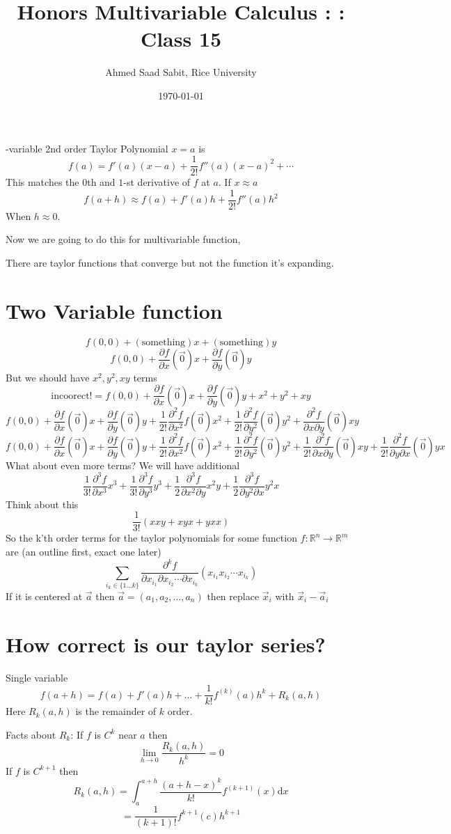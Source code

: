\documentclass[letter]{article}
\title{Honors Multivariable Calculus : : Class 15}
\author{Ahmed Saad Sabit, Rice University}
\date{\today}
\begin{document}
-variable 2nd order Taylor Polynomial $x=a$ is 
\[
f(a) = f'(a) (x-a) + \frac{1}{2!} f''(a) (x-a)^2 + \cdots
\]
This matches the 0th and $ 1$-st derivative of $f$ at $a$. If $x \approx a$ 
\[
f(a+h) \approx f(a) + f'(a) h + \frac{1}{2!} f''(a) h^2
\]
When $h \approx 0$. 

Now we are going to do this for multivariable function,

There are taylor functions that converge but not the function it's expanding. 
\section*{Two Variable function} 
\[
f(0,0) + (\text{something}) x + (\text{something})y 
\]
\[
f(0,0) + \frac{\partial f}{\partial x}(\vec{0}) x + 
\frac{\partial f}{\partial y} (\vec{0}) y 
\] 
But we should have $x^2, y^2, xy$ terms
\[ \text{incoorect!} = 
f(0,0) + \frac{\partial f}{\partial x}(\vec{0}) x + 
\frac{\partial f}{\partial y} (\vec{0}) y +
x^2 
+ 
y^2 
+ 
xy 
\] 
\[ f(0,0) + \frac{\partial f}{\partial x}(\vec{0}) x + 
\frac{\partial f}{\partial y} (\vec{0}) y +
\frac{1}{2! } \frac{\partial^2 f}{\partial x^2} f(\vec{0}) x^2 
+ 
\frac{1}{2!} \frac{\partial^2 f}{\partial y^2 } (\vec{0})y^2 
+ 
\frac{\partial^2 f}{\partial x \partial y} (\vec{0})xy 
\] 
\[ f(0,0) + \frac{\partial f}{\partial x}(\vec{0}) x + 
\frac{\partial f}{\partial y} (\vec{0}) y +
\frac{1}{2! } \frac{\partial^2 f}{\partial x^2} f(\vec{0}) x^2 
+ 
\frac{1}{2!} \frac{\partial^2 f}{\partial y^2 } (\vec{0})y^2 
+ 
\frac{1}{2!}\frac{\partial^2 f}{\partial x \partial y} (\vec{0})xy 
+
\frac{1}{2!}\frac{\partial^2 f}{\partial y \partial x} (\vec{0}) yx
\] 
What about even more terms? We will have additional 
\[
\frac{1}{3!} \frac{\partial^3 f}{\partial x^3} x^3 + 
\frac{1}{3!} \frac{\partial^3 f}{\partial y^3} y^3 + 
\frac{1}{2} \frac{\partial ^3 f}{\partial x^2 \partial y} x^2 y + 
\frac{1}{2} \frac{\partial^3 f}{\partial y^2 \partial x} y^2 x 
\]
Think about this 
\[
\frac{1}{3!} (x x y + xy x + y x x )
\]
So the k'th order terms for the taylor polynomials for some function $f: \mathbb{R}^{n} \to \mathbb{R}^{m}$ are (an outline first, exact one later)
\[
	\sum_{i_k \in  \{1 \ldots k\} }^{} \frac{\partial^{k}f}{\partial x_{i_1} \partial x_{i_2} \cdots \partial x_{i_k} }\left(x_{i_1} x_{i_2} \cdots x_{i_k} \right)
\] 
If it is centered at $\vec{a}$ then $\vec{a} = (a_1, a_2, \ldots, a_n)$ then replace $\vec{x}_i$ with $\vec{x}_i - \vec{a}_i$

\section*{How correct is our taylor series? }
Single variable 
\[
f(a+h) = f(a) + f'(a) h + 
\ldots + 
\frac{1}{k!} f^{(k)} (a) h^{k} + R_k(a,h)
\]
Here $R_k(a,h)$ is the remainder of $k$ order. 

Facts about $R_k$: If $f$ is $C^{k}$ near $a$ then 
\[
\lim_{h \to 0} \frac{R_k(a,h)}{h^{k}} = 0
\]
If $f $ is $C^{k+1}$ then 
\[
R_k(a,h) = \int_a^{a+h} \frac{(a+h - x)^{k} }{k!} f^{(k+1)} (x) \mathrm{d} x
\]
\[
= \frac{1}{(k+1)!} f^{k+1}(c) h^{k+1}
\] 
\end{document}
